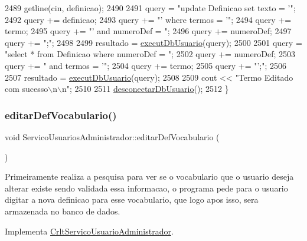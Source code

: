 \begin{DoxyCode}
2489      getline(cin, definicao);
2490 
2491      query = \textcolor{stringliteral}{"update Definicao set texto = '"};
2492      query += definicao;
2493      query +=  \textcolor{stringliteral}{"' where termos = '"};
2494      query += termo;
2495      query += \textcolor{stringliteral}{"' and numeroDef = "};
2496      query += numeroDef;
2497      query += \textcolor{stringliteral}{";"};
2498 
2499         resultado = \mbox{\hyperlink{comando_sql_8cpp_a748197580e7f9acdbf48c78de1f7924b}{executDbUsuario}}(query);
2500 
2501         query = \textcolor{stringliteral}{"select * from Definicao where numeroDef = "};
2502         query += numeroDef;
2503         query += \textcolor{stringliteral}{" and termos = '"};
2504         query += termo;
2505         query += \textcolor{stringliteral}{"';"};
2506 
2507         resultado = \mbox{\hyperlink{comando_sql_8cpp_a748197580e7f9acdbf48c78de1f7924b}{executDbUsuario}}(query);
2508 
2509         cout << \textcolor{stringliteral}{"Termo Editado com sucesso\(\backslash\)n\(\backslash\)n"};
2510 
2511         \mbox{\hyperlink{comando_sql_8cpp_a969be9911913568e30d4ae8963338bc3}{desconectarDbUsuario}}();
2512     \}
\end{DoxyCode}
\mbox{\label{class_servico_usuarios_administrador_a57d5f777ed99a006dc2db5cdb0f135b1}} 
\subsubsection{\texorpdfstring{editar\+Def\+Vocabulario()}{editarDefVocabulario()}}
{\footnotesize\ttfamily void Servico\+Usuarios\+Administrador\+::editar\+Def\+Vocabulario (\begin{DoxyParamCaption}{ }\end{DoxyParamCaption})\hspace{0.3cm}{\ttfamily [virtual]}}

Primeiramente realiza a pesquisa para ver se o vocabulario que o usuario deseja alterar existe sendo validada essa informacao, o programa pede para o usuario digitar a nova definicao para esse vocabulario, que logo apos isso, sera armazenada no banco de dados.

Implementa \mbox{\hyperlink{class_crlt_servico_usuario_administrador_aa4ace57c1fe84fc38302133426a2cfd8}{Crlt\+Servico\+Usuario\+Administrador}}.



